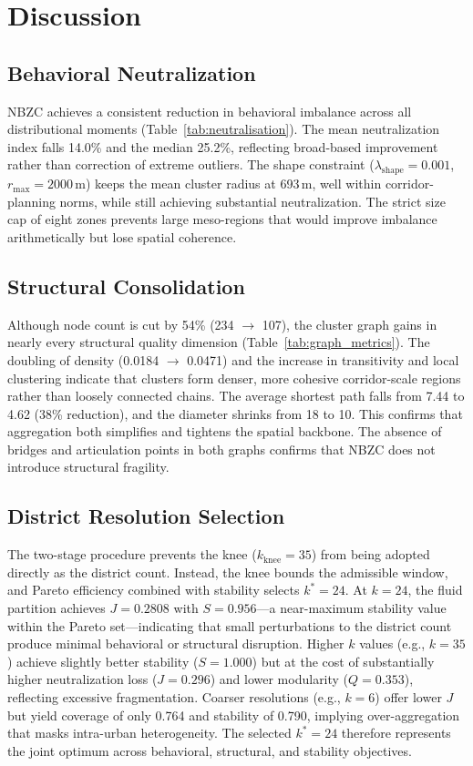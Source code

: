 \documentclass[conference]{IEEEtran}
\begin{document}
\section{Discussion}

\subsection{Behavioral Neutralization}
NBZC achieves a consistent reduction in behavioral imbalance across all
distributional moments (Table~\ref{tab:neutralisation}).
The mean neutralization index falls 14.0\% and the median 25.2\%,
reflecting broad-based improvement rather than correction of extreme
outliers.
The shape constraint ($\lambda_{\mathrm{shape}}=0.001$,
$r_{\max}=2000$\,m) keeps the mean cluster radius at 693\,m, well within
corridor-planning norms, while still achieving substantial neutralization.
The strict size cap of eight zones prevents large meso-regions that
would improve imbalance arithmetically but lose spatial coherence.

\subsection{Structural Consolidation}
Although node count is cut by 54\% (234 $\to$ 107), the cluster graph
gains in nearly every structural quality dimension
(Table~\ref{tab:graph_metrics}).
The doubling of density (0.0184 $\to$ 0.0471) and the increase in
transitivity and local clustering indicate that clusters form denser,
more cohesive corridor-scale regions rather than loosely connected
chains.
The average shortest path falls from 7.44 to 4.62 (38\% reduction),
and the diameter shrinks from 18 to 10.
This confirms that aggregation both simplifies and tightens the
spatial backbone.
The absence of bridges and articulation points in both graphs confirms
that NBZC does not introduce structural fragility.

\subsection{District Resolution Selection}
The two-stage procedure prevents the knee ($k_{\mathrm{knee}}=35$) from
being adopted directly as the district count.
Instead, the knee bounds the admissible window, and Pareto efficiency
combined with stability selects $k^*=24$.
At $k=24$, the fluid partition achieves $J=0.2808$ with $S=0.956$—a
near-maximum stability value within the Pareto set—indicating that small
perturbations to the district count produce minimal behavioral or
structural disruption.
Higher $k$ values (e.g., $k=35$) achieve slightly better stability
($S=1.000$) but at the cost of substantially higher neutralization loss
($J=0.296$) and lower modularity ($Q=0.353$), reflecting excessive
fragmentation.
Coarser resolutions (e.g., $k=6$) offer lower $J$ but yield coverage
of only 0.764 and stability of 0.790, implying over-aggregation that
masks intra-urban heterogeneity.
The selected $k^*=24$ therefore represents the joint optimum across
behavioral, structural, and stability objectives.
\end{document}
